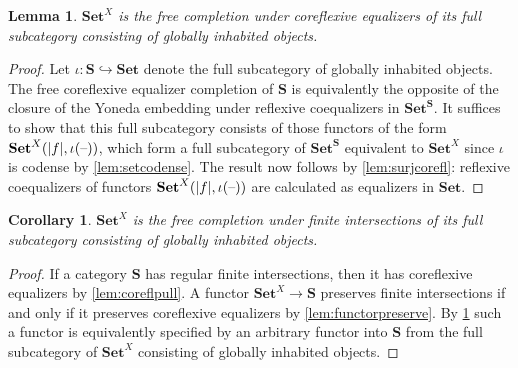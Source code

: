 \documentclass[11pt, oneside, article]{memoir}
\theoremstyle{plain}
\newtheorem{corollary}[theorem]{Corollary}
\newtheorem{lemma}[theorem]{Lemma}
\theoremstyle{definition}
\theoremstyle{remark}
\DeclarePairedDelimiter{\abs}{\lvert}{\rvert}
\newcommand{\dash}{{\mathord{\text{--}}}}
\newcommand{\namedcat}[1]{\mathbf{#1}}
\newcommand{\cat}[1]{\mathbf{#1}}
\newcommand{\Set}{\namedcat{Set}}
\newcommand{\pts}[1]{{\abs{#1}}}
\newcommand{\one}[1]{\pts{#1}}
\newcommand{\fun}[2]{{#2}^{#1}}
\newcommand{\Ho}[1]{#1}
\newcommand{\xX}{X}
\newcommand{\bS}{\cat{S}}
\newcommand{\sS}{\namedcat{S}}
\newcommand{\Sinj}{\bS_{\mathrm{inj}}}
\newcommand{\Srinj}{\bS_{\mathrm{rinj}}}
\begin{document}
\begin{lemma}\label{prop:freecoreflslice}
  $\Set^\xX$ is the free completion under coreflexive equalizers of its
  full subcategory consisting of globally inhabited objects.
\end{lemma}
\begin{proof}
  Let $\iota \colon \sS \hookrightarrow \Set$ denote the full
  subcategory of globally inhabited objects.  The free coreflexive equalizer
  completion of $\sS$ is equivalently the opposite of the closure of
  the Yoneda embedding under reflexive coequalizers in
  $\fun{\sS}{\Set}$. It suffices to show that this full subcategory
  consists of those functors of the form
  $\Ho{\Set^\xX}(\one{f}, \iota(\dash))$, which form a full
  subcategory of $\fun{\sS}{\Set}$ equivalent to $\Set^\xX$ since
  $\iota$ is codense by \cref{lem:setcodense}. The result now follows
  by \cref{lem:surjcorefl}: reflexive coequalizers of functors
  $\Ho{\Set^\xX}(\one{f}, \iota(\dash))$ are calculated as equalizers
  in $\Set$.
\end{proof}

\begin{corollary}\label{cor:freeintslice}
  $\Set^\xX$ is the free completion under finite intersections of its
  full subcategory consisting of globally inhabited objects.
\end{corollary}
\begin{proof}
  If a category $\bS$ has regular finite intersections, then it has
  coreflexive equalizers by \cref{lem:coreflpull}.  A functor
  $\Set^\xX \to \bS$ preserves finite intersections if and only if it
  preserves coreflexive equalizers by \cref{lem:functorpreserve}. By
  \cref{prop:freecoreflslice} such a functor is equivalently specified
  by an arbitrary functor into $\bS$ from the full subcategory of
  $\Set^\xX$ consisting of globally inhabited objects.
\end{proof}

\end{document}
